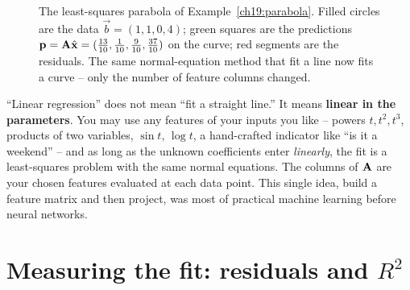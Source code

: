 \begin{figure}[H]
\centering
{}
\caption{The least-squares parabola of Example~\ref{ch19:parabola}. Filled circles are the data
$\vec{b}=(1,1,0,4)$; green squares are the predictions $\mathbf{p}=\mathbf{A}\hat{\mathbf{x}}
=(\tfrac{13}{10},\tfrac{1}{10},\tfrac{9}{10},\tfrac{37}{10})$ on the curve; red segments are the
residuals. The same normal-equation method that fit a line now fits a curve -- only the
number of feature columns changed.}
\label{ch19:parabola-fit}
\end{figure}

\begin{focusbox}
``Linear regression'' does not mean ``fit a straight line.'' It means \textbf{linear in the
parameters}. You may use any features of your inputs you like -- powers $t,t^2,t^3$, products of
two variables, $\sin t$, $\log t$, a hand-crafted indicator like ``is it a weekend'' -- and as long
as the unknown coefficients enter \emph{linearly}, the fit is a least-squares problem with the same
normal equations. The columns of $\mathbf{A}$ are your chosen features evaluated at each data point.
This single idea, build a feature matrix and then project, was most of practical machine learning
before neural networks.
\end{focusbox}

\section{Measuring the fit: residuals and \texorpdfstring{$R^2$}{R-squared}}

